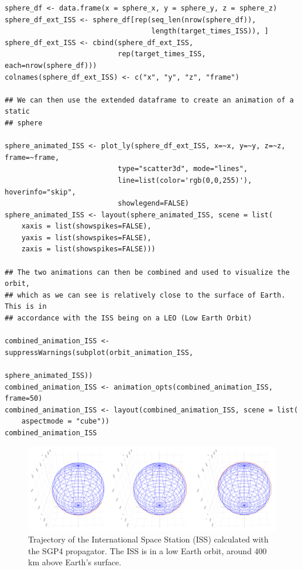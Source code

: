 \begin{verbatim}
sphere_df <- data.frame(x = sphere_x, y = sphere_y, z = sphere_z)
sphere_df_ext_ISS <- sphere_df[rep(seq_len(nrow(sphere_df)), 
                                   length(target_times_ISS)), ]
sphere_df_ext_ISS <- cbind(sphere_df_ext_ISS, 
                           rep(target_times_ISS, each=nrow(sphere_df)))
colnames(sphere_df_ext_ISS) <- c("x", "y", "z", "frame")

## We can then use the extended dataframe to create an animation of a static
## sphere

sphere_animated_ISS <- plot_ly(sphere_df_ext_ISS, x=~x, y=~y, z=~z, frame=~frame, 
                           type="scatter3d", mode="lines", 
                           line=list(color='rgb(0,0,255)'), hoverinfo="skip",
                           showlegend=FALSE)
sphere_animated_ISS <- layout(sphere_animated_ISS, scene = list(
    xaxis = list(showspikes=FALSE), 
    yaxis = list(showspikes=FALSE),
    zaxis = list(showspikes=FALSE)))

## The two animations can then be combined and used to visualize the orbit,
## which as we can see is relatively close to the surface of Earth. This is in
## accordance with the ISS being on a LEO (Low Earth Orbit)

combined_animation_ISS <- suppressWarnings(subplot(orbit_animation_ISS, 
                                                   sphere_animated_ISS))
combined_animation_ISS <- animation_opts(combined_animation_ISS, frame=50)
combined_animation_ISS <- layout(combined_animation_ISS, scene = list(
    aspectmode = "cube"))
combined_animation_ISS
\end{verbatim}

\begin{figure}[H]

{\centering \includegraphics[width=0.99\linewidth]{static/ISS_static} 

}

\caption{Trajectory of the International Space Station (ISS) calculated with the SGP4 propagator. The ISS is in a low Earth orbit, around 400 km above Earth's surface.}\label{fig:sgp4-ISS-figure-static}
\end{figure}

